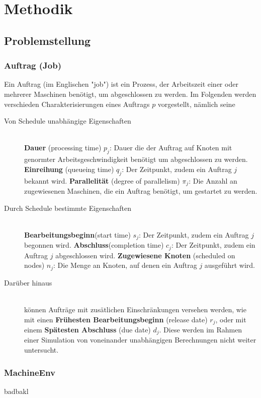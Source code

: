 \chapter{Methodik}
\label{chap:ein}

\section{Problemstellung}


\subsection{Auftrag (Job)}
Ein Auftrag (im Englischen "job") ist ein Prozess, der Arbeitszeit einer oder mehrerer Maschinen benötigt, um abgeschlossen zu werden. Im Folgenden werden verschieden Charakterisierungen eines Auftrags $p$ vorgestellt, nämlich seine

\begin{description}
\item[Von Schedule unabhängige Eigenschaften] \hfil \\
\textbf{Dauer} (processing time) $p_j$: Dauer die der Auftrag auf Knoten mit genormter Arbeitsgeschwindigkeit benötigt um abgeschlossen zu werden.
\textbf{Einreihung} (queueing time) $q_j$: Der Zeitpunkt, zudem ein Auftrag $j$ bekannt wird.
\textbf{Parallelität} (degree of parallelism) $\pi_j$: Die Anzahl an zugewiesenen Maschinen, die ein Auftrag benötigt, um gestartet zu werden.
\item[Durch Schedule bestimmte Eigenschaften]\hfill \\ 
\textbf{Bearbeitungsbeginn}(start time) $s_j$: Der Zeitpunkt, zudem ein Auftrag $j$ begonnen wird. 
\textbf{Abschluss}(completion time) $c_j$: Der Zeitpunkt, zudem ein Auftrag $j$ abgeschlossen wird.
\textbf{Zugewiesene Knoten} (scheduled on nodes) $n_j$: Die Menge an Knoten, auf denen ein Auftrag $j$ ausgeführt wird.

\item[Darüber hinaus] \hfil \\
können Aufträge mit zusätlichen Einschränkungen versehen werden, wie mit einen \textbf{Frühesten Bearbeitungsbeginn} (release date) $r_j$, oder mit einem \textbf{Spätesten Abschluss} (due date) $d_j$. Diese werden im Rahmen einer Simulation von voneinander unabhängigen Berechnungen nicht weiter untersucht.
\end{description}


\subsection{MachineEnv}
badbakl

